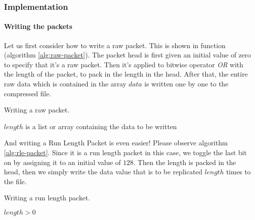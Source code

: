 \begin{refsection}
\subsubsection{Implementation}
\label{sec:packbits-implementation}

\paragraph{Writing the packets}
\label{sec:writing-packets}

Let us first consider how to write a raw packet. This is shown in
function (algorithm
\ref{alg:raw-packet}). The packet head is first given an initial value
of zero to specify that it's a raw packet. Then it's applied to
bitwise operator \textit{OR} with the length of the packet, to pack in
the length in the head. After that, the entire raw data which is
contained in the array $data$ is written one by one to the compressed file.

\begin{algorithm}[h]
  \caption{Writing a raw packet.}
  \label{alg:raw-packet}
  \begin{algorithmic}[1]
    \Require $length$ is a list or array containing the data to be written
      \State {}
        \State {}
      \EndForEach
    \EndFunction
  \end{algorithmic}
\end{algorithm}

And writing a Run Length Packet is even easier! Please observe
algorithm \ref{alg:rle-packet}. Since it is a run length packet in
this case, we toggle the last bit on by assigning it to an initial
value of $128$. Then the length is packed in the head, then we simply
write the data value that is to be replicated $length$ times to the
file.

\begin{algorithm}[h]
  \caption{Writing a run length packet.}
  \label{alg:rle-packet}
  \begin{algorithmic}[1]
    \Require $length > 0$
      \State {}
      \State {}
    \EndFunction
  \end{algorithmic}
\end{algorithm}


\end{refsection}
